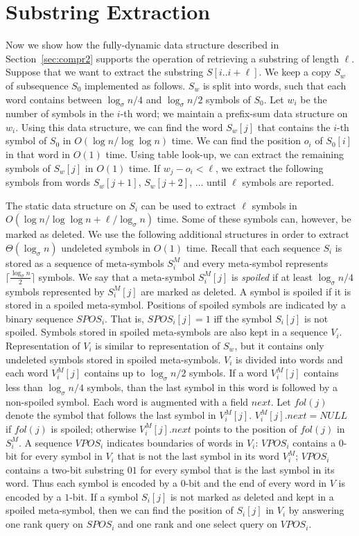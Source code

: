 \documentclass[11pt]{article}\usepackage{fullpage}
\def\ceil#1{\lceil #1 \rceil}
\begin{document}
\section{Substring Extraction}
\label{sec:substr}
Now we show how the fully-dynamic data structure described in Section~\ref{sec:compr2} supports the operation of retrieving a substring of length $\ell$.  
Suppose that we want to extract the substring $S[i..i+\ell]$.
We keep a copy $S_w$ of subsequence $S_0$ implemented as follows. 
$S_w$ is split into words, such that each word contains between $\log_{\sigma}n/4$ and $\log_{\sigma}n/2$ symbols of $S_0$. Let $w_i$ be the number of symbols in the $i$-th word; 
we maintain a prefix-sum data structure on $w_i$. Using this data structure, we can find the word $S_w[j]$ that contains the $i$-th symbol of $S_0$ in $O(\log n/\log\log n)$ time. We can find the position $o_i$ of $S_0[i]$ in that word in $O(1)$ time. Using table look-up, we can extract the remaining symbols of $S_w[j]$ in $O(1)$ time. If $w_j-o_i<\ell$, we extract the following symbols from words $S_w[j+1]$, $S_w[j+2]$, $\ldots$ until $\ell$ symbols are 
reported. 

The static data structure on $S_i$ can be used to extract $\ell$ symbols in $O(\log n/\log\log n+\ell/\log_{\sigma}n)$ time. Some of these symbols can, however, be marked as deleted. We use the following additional structures in order to extract $\Theta(\log_{\sigma}n)$ undeleted symbols in $O(1)$ time.
Recall that each sequence $S_i$ is stored as a sequence of meta-symbols $S^M_i$ and every meta-symbol represents $\ceil{\frac{\log_{\sigma}n}{2}}$ symbols. We say that a meta-symbol $S^M_i[j]$ is \emph{spoiled} if at least $\log_{\sigma}n/4$ symbols represented by $S^M_i[j]$ are marked as deleted. A symbol is spoiled if it is stored in a spoiled meta-symbol. Positions of spoiled symbols are indicated by a binary sequence $SPOS_i$. That is, $SPOS_i[j]=1$ iff the symbol $S_i[j]$ is not spoiled. Symbols stored in spoiled meta-symbols are also kept in a sequence $V_i$. Representation of  $V_i$ is similar to representation of $S_w$, but it contains only undeleted symbols stored in spoiled meta-symbols. $V_i$ is divided into words and each word $V_i^M[j]$ contains up to $\log_{\sigma}n/2$ 
symbols.  If a word $V_i^M[j]$ contains less than $\log_{\sigma}n/4$ symbols, than the last symbol in this word is followed by a non-spoiled symbol. Each word is augmented with a field $next$. 
Let $fol(j)$ denote the symbol that follows the last symbol in $V_i^M[j]$.
 $V^M_i[j].next=NULL$ if $fol(j)$ is spoiled; otherwise $V^M_i[j].next$ points to the position of $fol(j)$ in $S_i^M$. 
A sequence  $VPOS_i$ indicates boundaries of words in $V_i$: $VPOS_i$ contains a $0$-bit for every symbol in $V_i$ that is not the last symbol in 
its word $V_i^M$; $VPOS_i$ contains a two-bit substring $01$ for every symbol that is the last symbol in its word. Thus each symbol is encoded by a $0$-bit and the end of every word in $V$ is encoded by a $1$-bit. If a symbol $S_i[j]$ is not marked as deleted and kept in a spoiled meta-symbol, then we can find the position of $S_i[j]$ in $V_i$ by answering one rank query on $SPOS_i$ and one rank and one select query on $VPOS_i$. 
\end{document}
